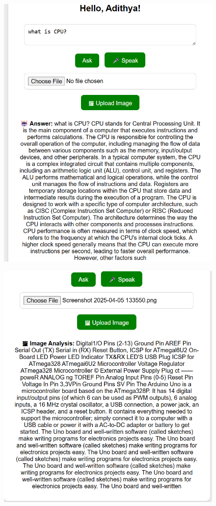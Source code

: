 \documentclass{josis}
\begin{document}
\begin{figure}[h]
  \centering
  \begin{minipage}{0.45\textwidth}
    \centering
    \includegraphics[width=\linewidth]{third.png}
    
    \label{fig:minipage1}
  \end{minipage}
  \hfill
  \begin{minipage}{0.45\textwidth}
    \centering
    \includegraphics[width=\linewidth]{fourth.png}
    

\end{minipage}
\end{figure}
\end{document}
